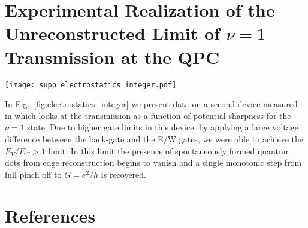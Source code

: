 \documentclass[reprint,prl,aps,superscriptaddress]{revtex4-1}
\begin{document}
\section{Experimental Realization of the Unreconstructed Limit of $\nu = 1$ Transmission at the QPC}
\begin{figure*}[ht]
    \texttt{[image: supp\_electrostatics\_integer.pdf]}
    \caption{
    \textbf{Signatures of reconstruction in $G$ between $\nu = 1$ edge modes.} 
    \textbf{(a)} The conductance measured across the QPC with both the East and West regions in $\nu = 1$ at B = 8T. The East and West gate voltages are swept in the opposition direction of $V_{\text{BG}}$ along the y axis, through the range $V_\mathrm{EW} \in (0.6V, -2.191V)$, to maintain a fixed filling factor while varying the voltage difference and thereby the potential sharpness.
    \textbf{(b)} The simulated electric potential at the monolayer, corresponding to the operating point I.
    \textbf{(c)} Same as (b) but at the operating point II, where the potential is much softer.
    \textbf{(d)} Simulated potential along the contours marked in grey and black in panels B and C, respectively. The softness is quantified by the maximum magnitude of the in-plane confining electric field, $E_{\parallel}$ (\textit{i.e.} simply the gradient of the potential normal to the boundary between the N(/S) and E(/W) regions).
    \label{fig:electrostatics_integer}
    }
\end{figure*}
In Fig.~\ref{fig:electrostatics_integer} we present data on a second device measured in \cite{cohen_universal_2023} which looks at the transmission as a function of potential sharpness for the $\nu = 1$ state.  Due to higher gate limits in this device, by applying a large voltage difference between the back-gate and the E/W gates, we were able to achieve the $E_V / E_C > 1$ limit.  In this limit the presence of spontaneously formed quantum dots from edge reconstruction begins to vanish and a single monotonic step from full pinch off to $G = e^2/h$ is recovered.

\normalem
\section{References}


\end{document}
